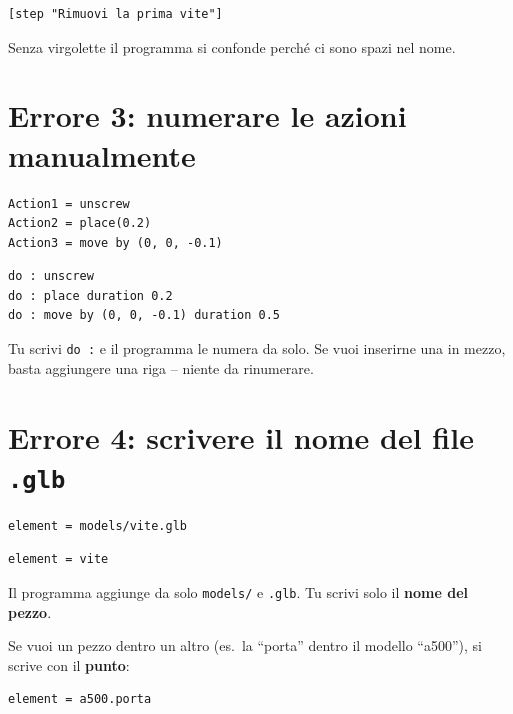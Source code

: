 ﻿\documentclass[a4paper,12pt,oneside]{book}
\newcommand{\kw}[1]{\texttt{\color{keycolor}#1}}
\begin{document}
\begin{giusto}
\begin{lstlisting}
[step "Rimuovi la prima vite"]
\end{lstlisting}
\end{giusto}

Senza virgolette il programma si confonde perché ci sono spazi nel nome.

\section{Errore 3: numerare le azioni manualmente}

\begin{sbagliato}
\begin{lstlisting}
Action1 = unscrew
Action2 = place(0.2)
Action3 = move by (0, 0, -0.1)
\end{lstlisting}
\end{sbagliato}

\begin{giusto}
\begin{lstlisting}
do : unscrew
do : place duration 0.2
do : move by (0, 0, -0.1) duration 0.5
\end{lstlisting}
\end{giusto}

Tu scrivi \kw{do :} e il programma le numera da solo. Se vuoi inserirne una
in mezzo, basta aggiungere una riga -- niente da rinumerare.

\section{Errore 4: scrivere il nome del file \texttt{.glb}}

\begin{sbagliato}
\begin{lstlisting}
element = models/vite.glb
\end{lstlisting}
\end{sbagliato}

\begin{giusto}
\begin{lstlisting}
element = vite
\end{lstlisting}
\end{giusto}

Il programma aggiunge da solo \texttt{models/} e \texttt{.glb}. Tu scrivi solo il
\textbf{nome del pezzo}.

\begin{notablu}
Se vuoi un pezzo dentro un altro (es.\ la ``porta'' dentro il modello ``a500''),
si scrive con il \textbf{punto}:
\begin{lstlisting}
element = a500.porta
\end{lstlisting}
\end{notablu}
\end{document}

